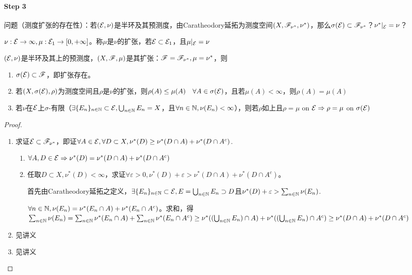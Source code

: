 \documentclass{ctexbook}
\begin{document}
\paragraph{Step 3}
问题（测度扩张的存在性）：若$(\mathcal{E},\nu)$是半环及其预测度，由Caratheodory延拓为测度空间$(X,\mathscr{F}_{\nu^{*}},\nu^{*})$，那么$\sigma(\mathcal{E})\subset\mathscr{F}_{\nu^{*}}$？$\nu^{*}|_{\mathcal{E}}=\nu$？

\begin{Def}[集函数的扩张]
  $\nu:\mathcal{E}\to\infty,\mu:\mathcal{E}_{1}\to[0,+\infty]$。称$\mu$是$\nu$的扩张，若$\mathcal{E}\subset \mathcal{E}_{1}$，且$\mu|_{\mathcal{E}}=\nu$
\end{Def}

\begin{Thm}
  $(\mathcal{E},\nu)$是半环及其上的预测度，$(X,\mathscr{F},\mu)$是其扩张：$\mathscr{F}=\mathscr{F}_{\nu^{*}},\mu=\nu^{*}$，则
  \begin{enumerate}
  \item $\sigma(\mathcal{E})\subset\mathscr{F}$，即扩张存在。
  \item 若$(X,\sigma(\mathcal{E}),\rho)$为测度空间且$\rho$是$\nu$的扩张，则$\rho(A)\leq\mu(A)\quad\forall A\in\sigma(\mathcal{E})$，且若$\mu(A)<\infty$，则$\rho(A)=\mu(A)$
  \item 若$\nu$在$\mathcal{E}$上$\sigma$-有限（$\exists \{E_{n}\}_{n\in\mathbb{N}}\subset \mathcal{E},\bigcup_{n\in\mathbb{N}}E_{n}=X$，且$\forall n\in\mathbb{N},\nu(E_{n})<\infty$），则若$\rho$如上且$\rho=\mu$ on $\mathcal{E}\Rightarrow \rho=\mu$ on $\sigma(\mathcal{E})$
  \end{enumerate}
\end{Thm}

\begin{proof}
  \begin{enumerate}
  \item 求证$\mathcal{E}\subset \mathscr{F}_{\nu^{*}}$，即证$\forall A\in\mathcal{E},\forall D\subset X,\nu^{*}(D)\geq \nu^{*}(D\cap A)+\nu^{*}(D\cap A^{c})$.
    \begin{enumerate}
    \item $\forall A,D\in\mathcal{E}\Rightarrow \nu^{*}(D)=\nu^{*}(D\cap A)+\nu^{*}(D\cap A^{c})$
    \item 任取$D\subset X, \nu^{*}(D)<\infty$，求证$\forall\varepsilon>0, \nu^{*}(D)+\varepsilon>\nu^{*}(D\cap A)+\nu^{*}(D\cap A^{c})$。

      首先由Caratheodory延拓之定义，$\exists \{E_{n}\}_{n\in\mathbb{N}}\subset\mathcal{E},E=\bigcup_{n\in\mathbb{N}}E_{n}\supset D$且$\nu^{*}(D)+\varepsilon>\sum_{n\in\mathbb{N}}\nu(E_{n})$.

      $\forall n\in\mathbb{N},\nu(E_n)=\nu^{*}(E_{n}\cap A)+\nu^{*}(E_{n}\cap A^{c})$。求和，得$\sum_{n\in\mathbb{N}}\nu(E_{n})=\sum_{n\in\mathbb{N}}\nu^{*}(E_{n}\cap A)+\sum_{n\in\mathbb{N}}\nu^{*}(E_{n}\cap A^{c})\geq\nu^{*}((\bigcup_{n\in\mathbb{N}}E_{n})\cap A)+\nu^{*}((\bigcup_{n\in\mathbb{N}}E_{n})\cap A^{c})\geq \nu^{*}(D\cap A)+\nu^{*}(D\cap A^{c})$
    \end{enumerate}
    
  \item 见讲义
    
  \item 见讲义
  \end{enumerate}
\end{proof}
\end{document}
